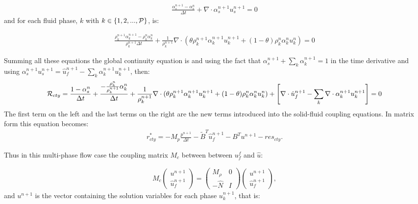 \begin{eqnarray}
\frac{ \alpha_s^{n+1} -\alpha_s^n}{\Delta t} + \nabla\cdot \alpha_s^{n+1} u_s^{n+1} =0
\end{eqnarray} 
and for each fluid phase, $k$ with $ k\in\{1,2,...,{\cal P}\}$, is: 


\begin{eqnarray}
\frac{ \rho_k^{n+1} \alpha_k^{n+1} -\rho_k^{n}\alpha_k^n}{ \rho_k^{n+1}\Delta t} 
+ \frac{1}{\rho_k^{n+1} } \nabla\cdot (\theta \rho_k^{n+1} \alpha_k^{n+1} u_k^{n+1}+(1-\theta) \rho_k^{n} \alpha_k^{n} u_k^{n}) =0
\end{eqnarray} 

Summing all these equations the global continuity equation is and using the fact that $ \alpha_s^{n+1}+\sum_k\alpha_k^{n+1}=1$ in the time 
derivative and using $\alpha_s^{n+1} u_s^{n+1}=\hat u_f^{n+1} - \sum_k\alpha_k^{n+1} u_k^{n+1}$, then: 
\begin{eqnarray}
{\cal{R}}_{cty} =\frac{1-\alpha_s^n}{\Delta t} + 
\frac{  - \frac{\rho_k^{n}}{\rho_k^{n+1}}\alpha_k^n}{ \Delta t} 
+ \frac{1}{\rho_k^{n+1} } \nabla\cdot (\theta \rho_k^{n+1} \alpha_k^{n+1} u_k^{n+1}+(1-\theta) \rho_k^{n} \alpha_k^{n} u_k^{n}) 
+\left[ \nabla\cdot\hat u_f^{n+1} - \sum_k \nabla\cdot \alpha_k^{n+1} u_k^{n+1} \right]
=0
\end{eqnarray} 
The first term on the left and the last terms on the right are the new terms introduced into the solid-fluid coupling equations. 
In matrix form this equation becomes: 
\begin{eqnarray}
{r}_{cty}^* =-M_p \frac{p^{n+1}}{\Delta t} - \tilde B^T \hat u_f^{n+1} - B^T u^{n+1} - res_{cty} . 
\end{eqnarray} 

Thus in this multi-phase flow case the coupling matrix $M_c$ between between $u_f^f$ and $\hat u$: 

\begin{eqnarray}
M_c 
\begin{pmatrix}
u^{n+1} \\ \hat u_f^{n+1}
\end{pmatrix}  
=
\begin{pmatrix}
M_\rho  & 0 \\ 
-\hat N  & I 
\end{pmatrix} 
\begin{pmatrix}
u^{n+1} \\ \hat u_f^{n+1} 
\end{pmatrix}  , 
\end{eqnarray}
and $u^{n+1}$ is the vector containing the solution variables for each phase $u_k^{n+1}$, that is: 

